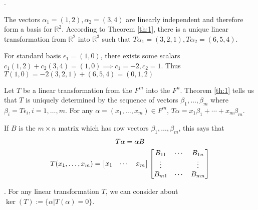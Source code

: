 \documentclass[8pt]{beamer}
\newcommand{\mbb}[1]{\mathbb{#1}}
\begin{document}
\begin{frame}{.}
    \begin{example}
        The vectors $\alpha_1 = (1,2), \alpha_2=(3,4)$ are linearly independent and therefore form a basis for $\mbb{R}^2$. According to Theorem \ref{th:1}, there is a unique linear transformation from $\mbb{R}^2$ into $\mbb{R}^3$ such that $T \alpha_1 = (3,2,1), T \alpha_2 = (6,5,4)$.

        For standard basis $\epsilon_1 = (1,0)$, there exists some scalars $c_1 (1,2) + c_2 (3,4) = (1,0) \implies c_1=-2, c_2=1$.
        Thus $T(1,0) = -2 (3,2,1) + (6,5,4) = (0,1,2)$
    \end{example}

    \begin{example}
        Let $T$ be a linear transformation from the $F^m$ into the $F^n$. Theorem \ref{th:1} tells us that $T$ is uniquely determined by the sequence of vectors $\beta_1, \dots, \beta_m$ where $\beta_i = T \epsilon_i, i=1, \dots, m$. For any $\alpha =(x_1, \dots, x_m)\in F^m$, $T \alpha = x_1 \beta_1 + \cdots + x_m \beta_m$.

        If $B$ is the $m \times n$ matrix which has row vectors $\beta_1, \dots, \beta_m$, this says that 
        \[
            \begin{gathered}
                T \alpha = \alpha B \\
                T (x_1, \dots, x_m) = \left[\begin{matrix} x_1 & \cdots & x_m \end{matrix}\right] \left[\begin{matrix}
                    B_{11} & \cdots & B_{1n} \\
                    \vdots & \empty & \vdots \\
                    B_{m1} & \cdots & B_{mn}
                \end{matrix}\right]
            \end{gathered}
        \]
    \end{example}
\end{frame}

\begin{frame}{.}
    For any linear transformation $T$, we can consider about $\ker{(T)} := \{\alpha | T(\alpha) = 0\}$.
\end{frame}
\end{document}
